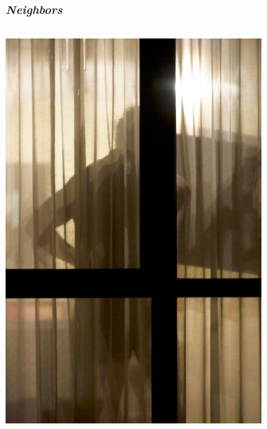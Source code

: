\documentclass{beamer}
\begin{document}
\begin{frame}
\frametitle{\emph{Neighbors}}


    \begin{columns}[c] %
    \includegraphics[width=\textwidth,height=0.8\textheight,keepaspectratio]{img/10_website_IMG_4763}


\end{columns}
\end{frame}
\end{document}

